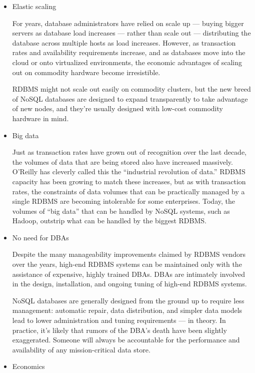 \begin{itemize}

\item Elastic scaling

For years, database administrators have relied on scale up — buying bigger servers as database load increases — rather than scale out — distributing the database across multiple hosts as load increases. However, as transaction rates and availability requirements increase, and as databases move into the cloud or onto virtualized environments, the economic advantages of scaling out on commodity hardware become irresistible.

RDBMS might not scale out easily on commodity clusters, but the new breed of NoSQL databases are designed to expand transparently to take advantage of new nodes, and they’re usually designed with low-cost commodity hardware in mind.


\item Big data

Just as transaction rates have grown out of recognition over the last decade, the volumes of data that are being stored also have increased massively. O’Reilly has cleverly called this the “industrial revolution of data.” RDBMS capacity has been growing to match these increases, but as with transaction rates, the constraints of data volumes that can be practically managed by a single RDBMS are becoming intolerable for some enterprises. Today, the volumes of “big data” that can be handled by NoSQL systems, such as Hadoop, outstrip what can be handled by the biggest RDBMS.


\item No need for DBAs

Despite the many manageability improvements claimed by RDBMS vendors over the years, high-end RDBMS systems can be maintained only with the assistance of expensive, highly trained DBAs. DBAs are intimately involved in the design, installation, and ongoing tuning of high-end RDBMS systems.

NoSQL databases are generally designed from the ground up to require less management:  automatic repair, data distribution, and simpler data models lead to lower administration and tuning requirements — in theory. In practice, it’s likely that rumors of the DBA’s death have been slightly exaggerated. Someone will always be accountable for the performance and availability of any mission-critical data store.


\item Economics


\end{itemize}
